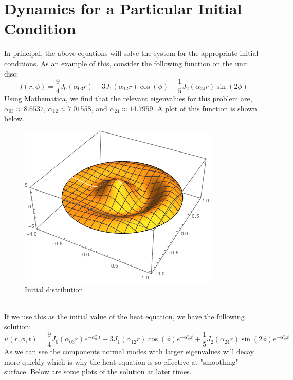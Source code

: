 \documentclass{paper}
\begin{document}
\section{Dynamics for a Particular Initial Condition}
In principal, the above equations will solve the system for the appropriate initial conditions. As an example of this, consider the following function on the unit disc:
\begin{equation}f(r,\phi)=\frac{9}{4}J_0(\alpha_{03}r)-3 J_1(\alpha_{12}r)\cos(\phi)+\frac{1}{5} J_2(\alpha_{24}r)\sin(2\phi)
\end{equation}
Using Mathematica, we find that the relevant eigenvalues for this problem are, $\alpha_{03}\approx8.6537$, $\alpha_{12}\approx 7.01558$, and $\alpha_{24}\approx 14.7959$. A plot of this function is shown below.\\
\begin{center}
\begin{figure}
\includegraphics[width = 4.5 cm]{images/initialvalue.png}
\caption{Initial distribution}\end{figure}
\end{center}
\\

If we use this as the initial value of the heat equation, we have the following solution:
\begin{equation}
    u(r,\phi,t)=\frac{9}{4}J_0(\alpha_{03}r)e^{-\alpha_{03}^2 t}-3 J_1(\alpha_{12}r)\cos(\phi)e^{-\alpha_{12}^2 t}+\frac{1}{5} J_2(\alpha_{24}r)\sin(2\phi)e^{-\alpha_{12}^2 t}

\end{equation}
As we can see the components normal modes with larger eigenvalues will decay more quickly which is why the heat equation is so effective at "smoothing" surface. Below are some plots of the solution at later times.
\end{document}
